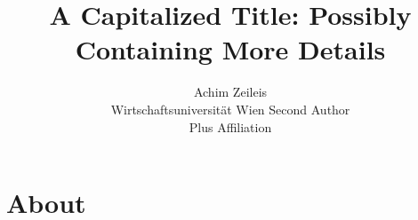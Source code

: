 \documentclass[codesnippet]{jss}
\author{Achim Zeileis\\Wirtschaftsuniversit\"at Wien \And 
        Second Author\\Plus Affiliation}
\title{A Capitalized Title: Possibly Containing More Details}
\begin{document}

\section[About Java]{About }
\end{document}

